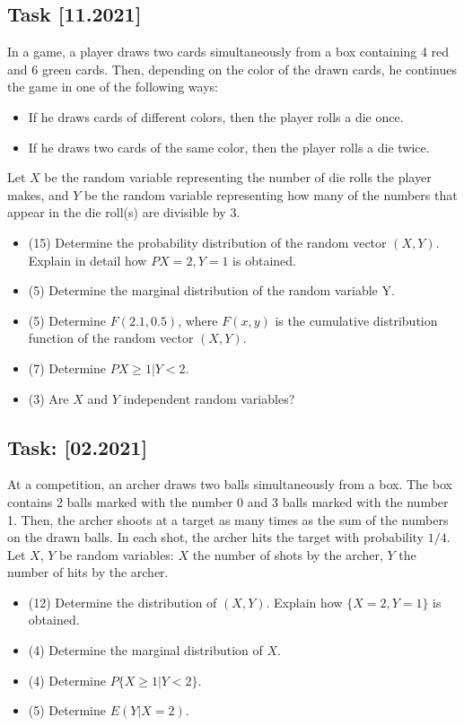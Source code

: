 \documentclass[a4paper, 12pt]{article}
\begin{document}
\subsection*{Task [11.2021]}
In a game, a player draws two cards simultaneously from a box containing 4 red and 6 green cards. Then, depending on the color of the drawn cards, he continues the game in one of the following ways:

\begin{itemize}
    \item If he draws cards of different colors, then the player rolls a die once.
    \item If he draws two cards of the same color, then the player rolls a die twice.
\end{itemize}

Let $X$ be the random variable representing the number of die rolls the player makes, and $Y$ be the random variable representing how many of the numbers that appear in the die roll(s) are divisible by 3.

\begin{itemize}
\item [a)] (15) Determine the probability distribution of the random vector $(X, Y)$. Explain in detail how $P{X=2, Y=1}$ is obtained.
\item  [b)] (5) Determine the marginal distribution of the random variable Y.
\item  [c)] (5) Determine $F(2.1, 0.5)$, where $F(x, y)$ is the cumulative distribution function of the random vector $(X, Y)$.
\item  [d)] (7) Determine $P{X \geq 1 | Y < 2}$.
\item  [e)] (3) Are $X$ and $Y$ independent random variables?
\end{itemize}

\subsection*{Task: [02.2021]}

At a competition, an archer draws two balls simultaneously from a box. The box contains 2 balls marked with the number 0 and 3 balls marked with the number 1. Then, the archer shoots at a target as many times as the sum of the numbers on the drawn balls. In each shot, the archer hits the target with probability $1/4$. Let $X$, $Y$ be random variables: $X$ the number of shots by the archer, $Y$ the number of hits by the archer.

\begin{itemize}
    \item [a)] (12) Determine the distribution of $(X, Y)$. Explain how $\{X=2, Y=1\}$ is obtained.
\item [b)] (4) Determine the marginal distribution of $X$.
\item [c)] (4) Determine $P\{X \geq 1 | Y < 2\}$.
\item [d)] (5) Determine $E(Y | X=2)$.
\end{itemize}
\end{document}

